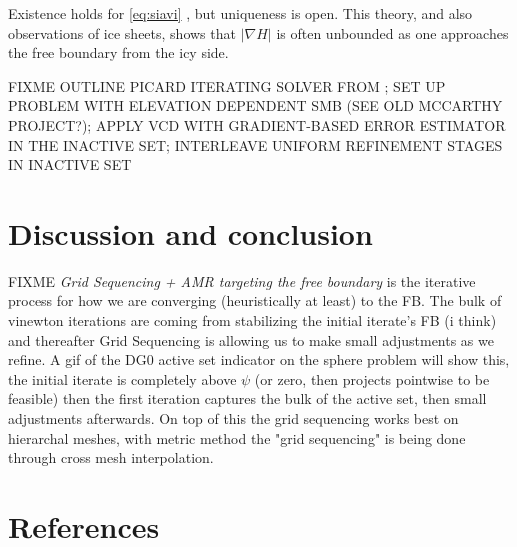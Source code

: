 \documentclass[]{interact}
\theoremstyle{plain}%
\theoremstyle{definition}
\theoremstyle{remark}
\newcommand{\grad}{\nabla}
\begin{document}
Existence holds for \eqref{eq:siavi} \cite{JouvetBueler2012}, but uniqueness is open.  This theory, and also observations of ice sheets, shows that $|\grad H|$ is often unbounded as one approaches the free boundary from the icy side.

FIXME OUTLINE PICARD ITERATING SOLVER FROM \cite{JouvetBueler2012}; SET UP PROBLEM WITH ELEVATION DEPENDENT SMB (SEE OLD MCCARTHY PROJECT?); APPLY VCD WITH GRADIENT-BASED ERROR ESTIMATOR IN THE INACTIVE SET; INTERLEAVE UNIFORM REFINEMENT STAGES IN INACTIVE SET


\section{Discussion and conclusion} \label{sec:conclusion}

FIXME \emph{Grid Sequencing + AMR targeting the free boundary} is the iterative process for how we are converging (heuristically at least) to the FB.  The bulk of vinewton iterations are coming from stabilizing the initial iterate's FB (i think) and thereafter Grid Sequencing is allowing us to make small adjustments as we refine.  A gif of the DG0 active set indicator on the sphere problem will show this, the initial iterate is completely above $\psi$ (or zero, then  projects pointwise to be feasible) then the first iteration captures the bulk of the active set, then small adjustments afterwards. On top of this the grid sequencing works best on hierarchal meshes, with metric method  the "grid sequencing" is being done through cross mesh interpolation.





\section{References}





\end{document}
